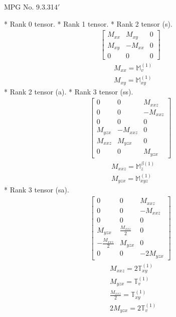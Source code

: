 \documentclass[fleqn,8pt,landscape]{jsarticle}
\begin{document}
\setcounter{MaxMatrixCols}{32}

\renewcommand{\tablename}{Table~}
\renewcommand{\figurename}{Figure~}
\begin{center}
\LARGE
MPG No. 9.3.31\quad$4'$
\end{center}
* Rank 0 tensor.
* Rank 1 tensor.
* Rank 2 tensor (s).
\begin{align*}
\begin{bmatrix} M_{xx} & M_{xy} & 0 \\ M_{xy} & - M_{xx} & 0 \\ 0 & 0 & 0 \end{bmatrix}
\end{align*}
\begin{align*}
& M_{xx} = \mathbb{M}_{v}^{(1)} \\
& M_{xy} = \mathbb{M}_{xy}^{(1)}
\end{align*}
* Rank 2 tensor (a).
* Rank 3 tensor (ss).
\begin{align*}
\begin{bmatrix} 0 & 0 & M_{xxz} \\ 0 & 0 & - M_{xxz} \\ 0 & 0 & 0 \\ M_{yzx} & - M_{xxz} & 0 \\ M_{xxz} & M_{yzx} & 0 \\ 0 & 0 & M_{yzx} \end{bmatrix}
\end{align*}
\begin{align*}
& M_{xxz} = \mathbb{M}_{z}^{\beta(1)} \\
& M_{yzx} = \mathbb{M}_{xyz}^{(1)}
\end{align*}
* Rank 3 tensor (sa).
\begin{align*}
\begin{bmatrix} 0 & 0 & M_{xxz} \\ 0 & 0 & - M_{xxz} \\ 0 & 0 & 0 \\ M_{yzx} & \frac{M_{xxz}}{2} & 0 \\ - \frac{M_{xxz}}{2} & M_{yzx} & 0 \\ 0 & 0 & - 2 M_{yzx} \end{bmatrix}
\end{align*}
\begin{align*}
& M_{xxz} = 2 \mathbb{T}_{xy}^{(1)} \\
& M_{yzx} = \mathbb{T}_{v}^{(1)} \\
& \frac{M_{xxz}}{2} = \mathbb{T}_{xy}^{(1)} \\
& 2 M_{yzx} = 2 \mathbb{T}_{v}^{(1)}
\end{align*}
\end{document}
